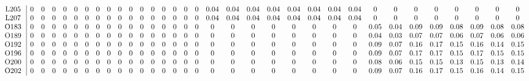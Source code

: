 \begin{table}[H]
\begin{center}
\begin{math}
\begin{array}{c|cccccccccccccccccccccccccccccccc}
\mathrm{L205} \hspace*{2pt} &  0 &  0 &  0 &  0 &  0 &  0 &  0 &  0 &  0 &  0 &  0 &  0 &  0 &  0 &  0 &  0 &       0.04 &       0.04 &       0.04 &       0.04 &       0.04 &       0.04 &       0.04 &       0.04 &  0 &  0 &  0 &  0 &  0 &  0 &  0 &  0 \\
\mathrm{L207} \hspace*{2pt} &  0 &  0 &  0 &  0 &  0 &  0 &  0 &  0 &  0 &  0 &  0 &  0 &  0 &  0 &  0 &  0 &       0.04 &       0.04 &       0.04 &       0.04 &       0.04 &       0.04 &       0.04 &       0.04 &  0 &  0 &  0 &  0 &  0 &  0 &  0 &  0 \\
\mathrm{O183} \hspace*{2pt} &  0 &  0 &  0 &  0 &  0 &  0 &  0 &  0 &  0 &  0 &  0 &  0 &  0 &  0 &  0 &  0 &  0 &  0 &  0 &  0 &  0 &  0 &  0 &  0 &       0.05 &       0.04 &       0.09 &       0.09 &       0.08 &       0.09 &       0.08 &       0.08 \\
\mathrm{O189} \hspace*{2pt} &  0 &  0 &  0 &  0 &  0 &  0 &  0 &  0 &  0 &  0 &  0 &  0 &  0 &  0 &  0 &  0 &  0 &  0 &  0 &  0 &  0 &  0 &  0 &  0 &       0.04 &       0.03 &       0.07 &       0.07 &       0.06 &       0.07 &       0.06 &       0.06 \\
\mathrm{O192} \hspace*{2pt} &  0 &  0 &  0 &  0 &  0 &  0 &  0 &  0 &  0 &  0 &  0 &  0 &  0 &  0 &  0 &  0 &  0 &  0 &  0 &  0 &  0 &  0 &  0 &  0 &       0.09 &       0.07 &       0.16 &       0.17 &       0.15 &       0.16 &       0.14 &       0.15 \\
\mathrm{O196} \hspace*{2pt} &  0 &  0 &  0 &  0 &  0 &  0 &  0 &  0 &  0 &  0 &  0 &  0 &  0 &  0 &  0 &  0 &  0 &  0 &  0 &  0 &  0 &  0 &  0 &  0 &       0.09 &       0.07 &       0.17 &       0.17 &       0.15 &       0.17 &       0.15 &       0.15 \\
\mathrm{O200} \hspace*{2pt} &  0 &  0 &  0 &  0 &  0 &  0 &  0 &  0 &  0 &  0 &  0 &  0 &  0 &  0 &  0 &  0 &  0 &  0 &  0 &  0 &  0 &  0 &  0 &  0 &       0.08 &       0.06 &       0.15 &       0.15 &       0.13 &       0.15 &       0.13 &       0.14 \\
\mathrm{O202} \hspace*{2pt} &  0 &  0 &  0 &  0 &  0 &  0 &  0 &  0 &  0 &  0 &  0 &  0 &  0 &  0 &  0 &  0 &  0 &  0 &  0 &  0 &  0 &  0 &  0 &  0 &       0.09 &       0.07 &       0.16 &       0.17 &       0.15 &       0.16 &       0.14 &       0.15 \\

\end{array}
\end{math}
\end{center}
\end{table}
